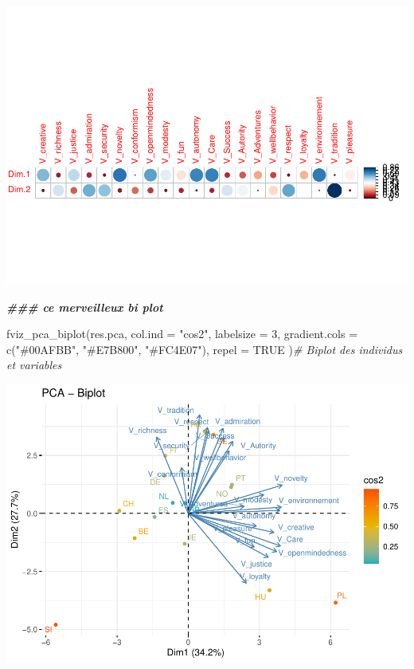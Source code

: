 \documentclass[
]{book}
\newenvironment{Shaded}{\begin{snugshade}}{\end{snugshade}}
\newcommand{\AttributeTok}[1]{\textcolor[rgb]{0.77,0.63,0.00}{#1}}
\newcommand{\CommentTok}[1]{\textcolor[rgb]{0.56,0.35,0.01}{\textit{#1}}}
\newcommand{\ConstantTok}[1]{\textcolor[rgb]{0.00,0.00,0.00}{#1}}
\newcommand{\DecValTok}[1]{\textcolor[rgb]{0.00,0.00,0.81}{#1}}
\newcommand{\DocumentationTok}[1]{\textcolor[rgb]{0.56,0.35,0.01}{\textbf{\textit{#1}}}}
\newcommand{\FunctionTok}[1]{\textcolor[rgb]{0.00,0.00,0.00}{#1}}
\newcommand{\NormalTok}[1]{#1}
\newcommand{\StringTok}[1]{\textcolor[rgb]{0.31,0.60,0.02}{#1}}
\begin{document}
\includegraphics{bookdown-demo_files/figure-latex/0609-1.pdf}

\begin{Shaded}
\begin{Highlighting}[]
\DocumentationTok{\#\#\# ce merveilleux bi plot}

\FunctionTok{fviz\_pca\_biplot}\NormalTok{(res.pca, }\AttributeTok{col.ind =} \StringTok{"cos2"}\NormalTok{, }\AttributeTok{labelsize =} \DecValTok{3}\NormalTok{,}
             \AttributeTok{gradient.cols =} \FunctionTok{c}\NormalTok{(}\StringTok{"\#00AFBB"}\NormalTok{, }\StringTok{"\#E7B800"}\NormalTok{, }\StringTok{"\#FC4E07"}\NormalTok{),}
             \AttributeTok{repel =} \ConstantTok{TRUE}\NormalTok{ )}\CommentTok{\# Biplot des individus et variables}
\end{Highlighting}
\end{Shaded}

\includegraphics{bookdown-demo_files/figure-latex/0609-2.pdf}
\end{document}

